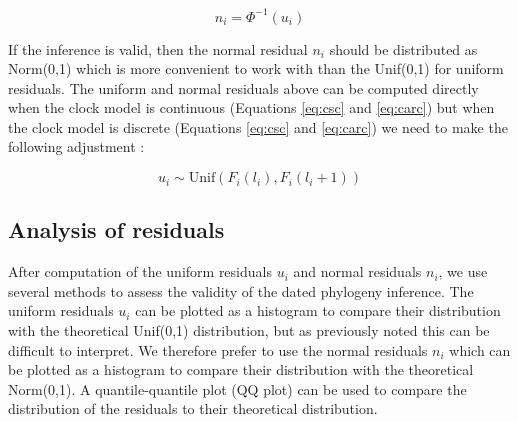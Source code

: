 \documentclass{article}
\begin{document}
\begin{equation}
n_i=\Phi^{-1}(u_i)
\label{eq:norm-resid}
\end{equation}

If the inference is valid, then the normal residual $n_i$ should be distributed
as Norm(0,1) which is more convenient to work with than the Unif(0,1) for uniform residuals.
The uniform and normal residuals above can be computed directly
when the clock model is continuous (Equations \ref{eq:csc} and \ref{eq:carc}) but when
the clock model is discrete (Equations \ref{eq:csc} and \ref{eq:carc}) we need to make the following
adjustment \citep{brockwellUniversalResidualsMultivariate2007,lauNewModelDiagnostics2014}:

\begin{equation}
u_i \sim \mathrm{Unif}(F_i(l_i),F_i(l_i+1))
\end{equation}

\subsection*{Analysis of residuals}

After computation of the uniform residuals $u_i$ and normal residuals $n_i$,
we use several methods to assess the validity of the dated phylogeny inference.
The uniform residuals $u_i$ can be plotted as a histogram to compare their
distribution with the theoretical Unif(0,1) distribution, but as previously noted this can
be difficult to interpret. We therefore prefer to use the normal residuals $n_i$ which can be plotted
as a histogram to compare their distribution with the theoretical Norm(0,1).
A quantile-quantile plot (QQ plot) can be used to compare the distribution of the residuals
to their theoretical distribution.
\end{document}
